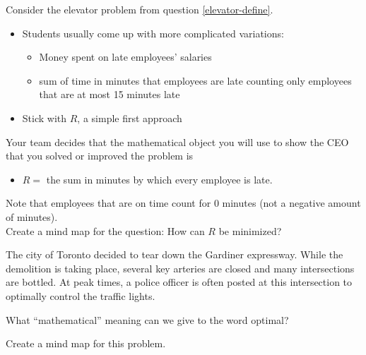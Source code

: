 \newpage


\question
\label{elevatorR}
Consider the elevator problem from question \ref{elevator-define}.


\begin{annotation}
	\begin{notes}
	\begin{itemize}
		\item Students usually come up with more complicated variations:
		\begin{itemize}
			\item Money spent on late employees' salaries
			\item sum of time in minutes that employees are late counting only employees that are at most 15 minutes late
		\end{itemize}
		\item Stick with $R$, a simple first approach
	\end{itemize}	
	\end{notes}
	
\end{annotation}

Your team decides that the mathematical object you will use to show the CEO that you solved or improved the problem is
\begin{itemize}
	\item $R=$ the sum in minutes by which every employee is late.
\end{itemize}

Note that employees that are on time count for 0 minutes (not a negative amount of minutes). \\

Create a mind map for the question: \quad How can $R$ be minimized?


\bookonlynewpage


\question

The city of Toronto decided to tear down the Gardiner expressway. While the demolition is taking place, several key arteries are closed and many intersections are bottled. 
At peak times, a police officer is often posted at this intersection to optimally control the traffic lights. 

\begin{parts}
	\item What ``mathematical'' meaning can we give to the word optimal? 
	\item Create a mind map for this problem.
\end{parts}




